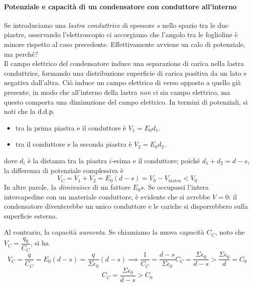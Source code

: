 \paragraph{Potenziale e capacità di un condensatore con conduttore all'interno}
Se introduciamo una \textit{lastra conduttrice} di spessore $s$ nello spazio tra le due piastre, osservando l'elettroscopio ci accorgiamo che l'angolo tra le foglioline è minore rispetto al caso precedente. Effettivamente avviene un calo di potenziale, ma perché?\\
Il campo elettrico del condensatore induce una separazione di carica nella lastra conduttrice, formando una distribuzione superficie di carica positiva da un lato e negativa dall'altra. Ciò induce un campo elettrico di verso opposto a quello già presente, in modo che all'interno della lastra \textit{non} ci sia campo elettrico, ma questo comporta una diminuzione del campo elettrico. In termini di potenziali, si noti che la $\mathrm{d.d.p.}$
\begin{itemize}
	\item tra la prima piastra e il conduttore è $V_1=E_0d_1$.
	\item tra il conduttore e la seconda piastra è $V_2=E_0d_2$.
\end{itemize}
dove $d_i$ è la distanza tra la piastra $i$-esima e il conduttore; poiché $d_1+d_2=d-s$, la differenza di potenziale complessiva è
\begin{equation*}
	V_{C}=V_1+V_2=E_0\left(d-s\right)=V_0-V_{lastra}<V_0
\end{equation*}
In altre parole, la \ddp \textit{diminuisce} di un fattore $E_0s$. Se occupassi l'intera intercapedine con un materiale conduttore, è evidente che si avrebbe $V=0$: il condensatore diventerebbe un unico conduttore e le cariche si disporrebbero sulla superficie esterna.

Al contrario, la capacità \textit{aumenta}. Se chiamiamo la nuova capacità $C_C$, noto che $V_{C}=\dfrac{q_0}{C_C}$, si ha
\begin{equation*}
	V_C=\frac{q}{C_C}=E_0\left(d-s\right)=\frac{q}{\Sigma \epsilon_0}\left(d-s\right)\implies \frac{1}{C_C}=\frac{d-s}{\Sigma \epsilon_0}C_C=\frac{\Sigma \epsilon_0}{d-s}>\frac{\Sigma \epsilon_0}{d}=C_0
\end{equation*}
\begin{equation}
	C_C=\frac{\Sigma \epsilon_0}{d-s}>C_0
\end{equation}
